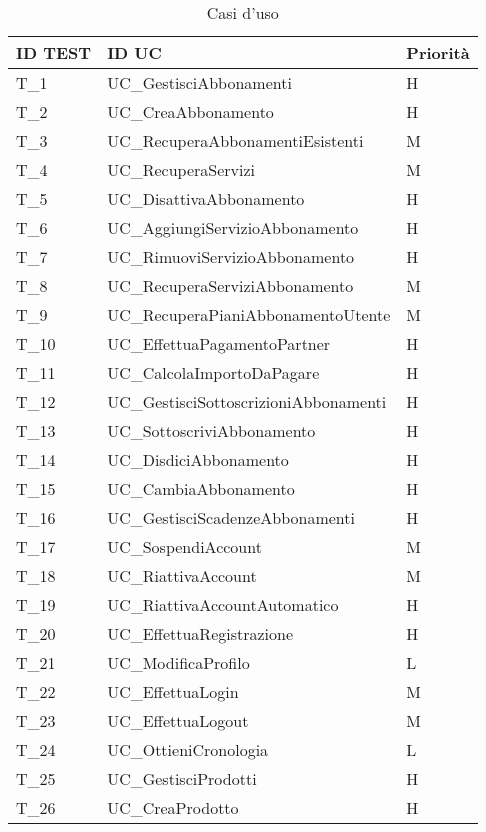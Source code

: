 \begin{longtable}{| p{} | p{} | p{} |} 
    \caption{Casi d'uso}\\
    \hline
    \textbf{ID TEST} & \textbf{ID UC} & \textbf{Priorità} \\\hline
    T\_1 & UC\_GestisciAbbonamenti & H\\\hline
    T\_2 & UC\_CreaAbbonamento & H\\\hline
    T\_3 & UC\_RecuperaAbbonamentiEsistenti & M\\\hline
    T\_4 & UC\_RecuperaServizi & M\\\hline
    T\_5 & UC\_DisattivaAbbonamento & H\\\hline
    T\_6 & UC\_AggiungiServizioAbbonamento & H\\\hline
    T\_7 & UC\_RimuoviServizioAbbonamento & H\\\hline
    T\_8 & UC\_RecuperaServiziAbbonamento & M\\\hline
    T\_9 & UC\_RecuperaPianiAbbonamentoUtente & M\\\hline
    T\_10 & UC\_EffettuaPagamentoPartner & H\\\hline
    T\_11 & UC\_CalcolaImportoDaPagare & H\\\hline
    T\_12 & UC\_GestisciSottoscrizioniAbbonamenti & H\\\hline
    T\_13 & UC\_SottoscriviAbbonamento & H\\\hline
    T\_14 & UC\_DisdiciAbbonamento & H\\\hline
    T\_15 & UC\_CambiaAbbonamento & H\\\hline
    T\_16 & UC\_GestisciScadenzeAbbonamenti & H\\\hline
    T\_17 & UC\_SospendiAccount & M\\\hline
    T\_18 & UC\_RiattivaAccount & M\\\hline
    T\_19 & UC\_RiattivaAccountAutomatico & H\\\hline
    T\_20 & UC\_EffettuaRegistrazione & H\\\hline
    T\_21 & UC\_ModificaProfilo & L\\\hline
    T\_22 & UC\_EffettuaLogin & M\\\hline
    T\_23 & UC\_EffettuaLogout & M\\\hline
    T\_24 & UC\_OttieniCronologia & L\\\hline
    T\_25 & UC\_GestisciProdotti & H\\\hline
    T\_26 & UC\_CreaProdotto & H\\\hline

\end{longtable}
